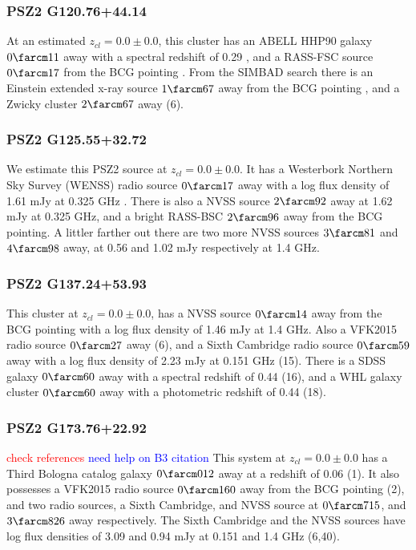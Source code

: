 \documentclass[apj, revtex4-1]{emulateapj}
\newcommand{\editorial}[1]{\textcolor{red}{#1}}
\newcommand{\peditorial}[1]{\textcolor{blue}{#1}}
\begin{document}
\subsubsection{PSZ2 G120.76+44.14}
At an estimated $z_{cl} = 0.0 \pm 0.0$, this cluster has an ABELL HHP90 galaxy $0\farcm11$ away with a spectral redshift of 0.29 \citep{Huchra1990}, and a RASS-FSC source $0\farcm17$ from the BCG pointing \citep{Voges2000}. From the SIMBAD search there is an Einstein extended x-ray source $1\farcm67$ away from the BCG pointing \citep{Oppenheimer1997}, and a Zwicky cluster $2\farcm67$ away (6).

\subsubsection{PSZ2 G125.55+32.72}
We estimate this PSZ2 source at $z_{cl} = 0.0 \pm 0.0$. It has a Westerbork Northern Sky Survey (WENSS) radio source $0\farcm17$ away with a log flux density of 1.61 mJy at 0.325 GHz \citep{Rengelink1997}. There is also a NVSS source $2\farcm92$ away at 1.62 mJy at 0.325 GHz, and a bright RASS-BSC $2\farcm96$ away from the BCG pointing. A littler farther out there are two more NVSS sources $3\farcm81$ and $4\farcm98$ away, at 0.56 and 1.02 mJy respectively at 1.4 GHz.

\subsubsection{PSZ2 G137.24+53.93}
This cluster at $z_{cl} = 0.0 \pm 0.0$, has a NVSS source $0\farcm14$ away from the BCG pointing with a log flux density of 1.46 mJy at 1.4 GHz. Also a VFK2015 radio source $0\farcm27$ away (6), and a Sixth Cambridge radio source $0\farcm59$ away with a log flux density of 2.23 mJy at 0.151 GHz (15). There is a SDSS galaxy $0\farcm60$ away with a spectral redshift of 0.44 (16), and a WHL galaxy cluster $0\farcm60$ away with a photometric redshift of 0.44 (18).

\subsubsection{PSZ2 G173.76+22.92}
\editorial{check references}
\peditorial{need help on B3 citation}
This system at $z_{cl} = 0.0 \pm 0.0$ has a Third Bologna catalog galaxy $0\farcm012$ away at a redshift of 0.06 (1). It also possesses a VFK2015 radio source $0\farcm160$ away from the BCG pointing (2), and two radio sources, a Sixth Cambridge, and NVSS source at  $0\farcm715$, and $3\farcm826$ away respectively. The Sixth Cambridge and the NVSS sources have log flux densities of 3.09 and 0.94 mJy at 0.151 and 1.4 GHz (6,40).
\end{document}
